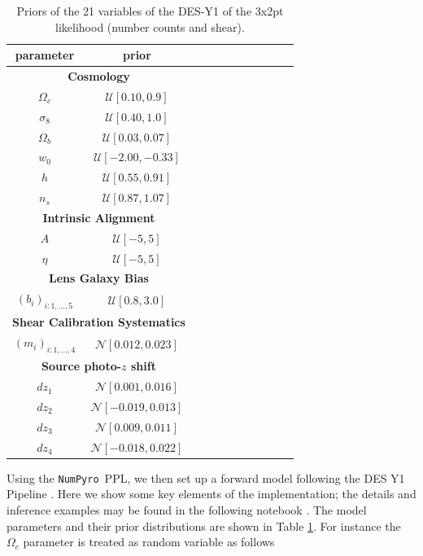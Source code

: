 \documentclass[twocolumn,twocolappendix,nofootinbib,iop]{openjournal}
\newcommand{\nblink}[1]{\href{https://github.com/DifferentiableUniverseInitiative/jax-cosmo-paper/blob/master/notebooks/#1.ipynb}{\faFileCodeO}}
\newcommand{\numpyro}{\texttt{NumPyro}}
\begin{document}
\begin{table}[htb]
\caption{Priors of the 21 variables of the DES-Y1 of the 3x2pt likelihood (number counts and shear).}
\label{tab-DESY1}
 \centering
\begin{tabular}{ccccccccccc}
\hline
 parameter &  prior \\
 \hline
  \multicolumn{2}{c}{\textbf{Cosmology}} \\
$\Omega_c$ & $\mathcal{U}[0.10, 0.9]$ \\ %
$\sigma_8$ & $\mathcal{U}[0.40, 1.0]$ \\
$\Omega_b$ & $\mathcal{U}[0.03, 0.07]$ \\
$w_0$ & $\mathcal{U}[-2.00, -0.33]$ \\
$h$ & $\mathcal{U}[0.55, 0.91]$ \\
$n_s$ & $\mathcal{U}[0.87, 1.07]$ \\
\multicolumn{2}{c}{\textbf{Intrinsic Alignment}} \\
$A$ & $\mathcal{U}[-5,5]$ \\
$\eta$ &$\mathcal{U}[-5,5]$ \\
\multicolumn{2}{c}{\textbf{Lens Galaxy Bias}} \\
$(b_i)_{i:1,\dots,5}$ & $\mathcal{U}[0.8,3.0]$ \\
\multicolumn{2}{c}{\textbf{Shear Calibration Systematics}} \\
$(m_i)_{i:1,\dots,4}$ & $\mathcal{N}[0.012,0.023]$ \\
\multicolumn{2}{c}{\textbf{Source photo-$z$ shift}} \\
$dz_1$ & $\mathcal{N}[0.001,0.016]$ \\ %
$dz_2$ & $\mathcal{N}[-0.019,0.013]$ \\
$dz_3$ & $\mathcal{N}[0.009,0.011]$ \\
$dz_4$ & $\mathcal{N}[-0.018,0.022]$ \\
\hline
\end{tabular}
\end{table}


Using the \numpyro\ PPL, we then set up a forward model following the DES Y1 Pipeline \citep{2018PhRvD..98d3526A}. Here we show some key elements of the implementation; the details and inference examples may be found in the following notebook \nblink{VectorizedNumPyro_block}. The model parameters and their prior distributions are shown in Table \ref{tab-DESY1}.  For instance the $\Omega_c$ parameter is treated as random variable as follows
\end{document}
